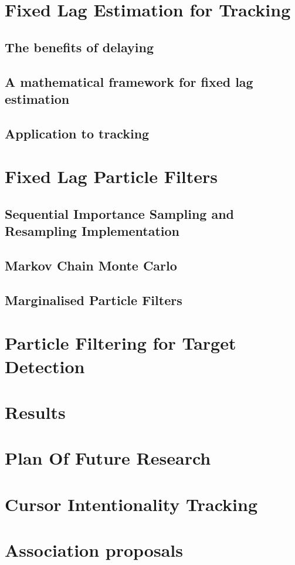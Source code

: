 \documentclass{RJWThesis}
\begin{document}
\chapter{Fixed Lag Estimation for Tracking}\label{FixedLag}
\section{The benefits of delaying}

\section{A mathematical framework for fixed lag estimation}
\label{sec:FixedLag2}
\section{Application to tracking}\label{FixedLag_App}


\chapter{Fixed Lag Particle Filters}
\section{Sequential Importance Sampling and Resampling Implementation}

\section{Markov Chain Monte Carlo}

\section{Marginalised Particle Filters}


\chapter{Particle Filtering for Target Detection}


\chapter{Results}



\chapter{Plan Of Future Research}


\chapter{Cursor Intentionality Tracking}


\cleardoublepage

\appendix
\chapter{Association proposals}




\end{document}
